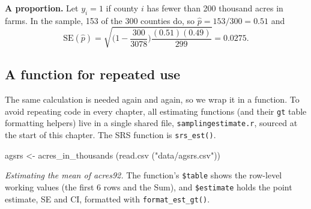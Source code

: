 \documentclass[
  letterpaper,
  DIV=11,
  numbers=noendperiod]{scrreprt}
\newenvironment{Shaded}{\begin{snugshade}}{\end{snugshade}}
\newcommand{\AttributeTok}[1]{\textcolor[rgb]{0.40,0.45,0.13}{#1}}
\newcommand{\DecValTok}[1]{\textcolor[rgb]{0.68,0.00,0.00}{#1}}
\newcommand{\FunctionTok}[1]{\textcolor[rgb]{0.28,0.35,0.67}{#1}}
\newcommand{\NormalTok}[1]{\textcolor[rgb]{0.00,0.23,0.31}{#1}}
\newcommand{\OtherTok}[1]{\textcolor[rgb]{0.00,0.23,0.31}{#1}}
\newcommand{\SpecialCharTok}[1]{\textcolor[rgb]{0.37,0.37,0.37}{#1}}
\newcommand{\StringTok}[1]{\textcolor[rgb]{0.13,0.47,0.30}{#1}}
\renewcommand{\[}{\begin{equation}}
\renewcommand{\]}{\end{equation}}
\begin{document}
\textbf{A proportion.} Let \(y_i = 1\) if county \(i\) has fewer than
200 thousand acres in farms. In the sample, 153 of the 300 counties do,
so \(\hat p = 153/300 = 0.51\) and \[
\mathrm{SE}(\hat p) = \sqrt{\Big(1-\frac{300}{3078}\Big)\frac{(0.51)(0.49)}{299}} = 0.0275 .
\]

\subsection{A function for repeated
use}\label{a-function-for-repeated-use}

The same calculation is needed again and again, so we wrap it in a
function. To avoid repeating code in every chapter, all estimating
functions (and their \texttt{gt} table formatting helpers) live in a
single shared file, \texttt{samplingestimate.r}, sourced at the start of
this chapter. The SRS function is \texttt{srs\_est()}.

\begin{Shaded}
\begin{Highlighting}[]
\NormalTok{agsrs }\OtherTok{\textless{}{-}} \FunctionTok{acres\_in\_thousands}\NormalTok{ (}\FunctionTok{read.csv}\NormalTok{ (}\StringTok{"data/agsrs.csv"}\NormalTok{))}
\end{Highlighting}
\end{Shaded}

\emph{Estimating the mean of acres92.} The function's \texttt{\$table}
shows the row-level working values (the first 6 rows and the Sum), and
\texttt{\$estimate} holds the point estimate, SE and CI, formatted with
\texttt{format\_est\_gt()}.

\begin{Shaded}
\end{Shaded}
\end{document}
